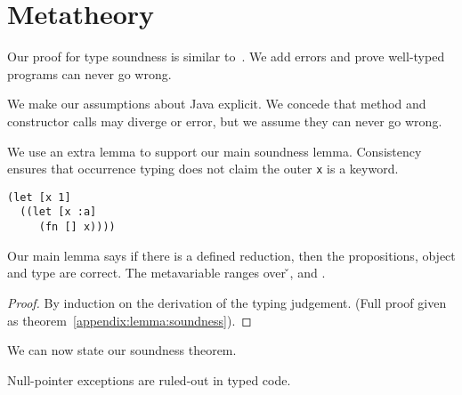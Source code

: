 \section{Metatheory}
\label{sec:metatheory}

Our proof for type soundness is similar to~\cite{TF10}. We add
errors and prove well-typed programs can never go wrong.

We make our assumptions about Java explicit. We concede that
method and constructor calls may diverge or error, but we assume they can
never go wrong.

{}



We use an extra lemma to support our main soundness lemma. Consistency
ensures that occurrence typing does not claim the outer 
\texttt{x} is a keyword. 

\begin{verbatim}
(let [x 1]
  ((let [x :a]
     (fn [] x))))
\end{verbatim}

{}

Our main lemma says if there is a defined reduction, then the propositions, object
and type are correct.
The metavariable  ranges over \v{}, \errorvalv{} and \wrong{}.

\begin{lemma}\label{main:lemma:soundness}

  {\soundnesslemmahypothesis}
  \begin{proof}
    By induction on the derivation of the typing judgement. 
    (Full proof given as theorem~\ref{appendix:lemma:soundness}).
  \end{proof}
\end{lemma}


We can now state our soundness theorem.

{}

{}

Null-pointer exceptions are ruled-out in typed code.

{}
